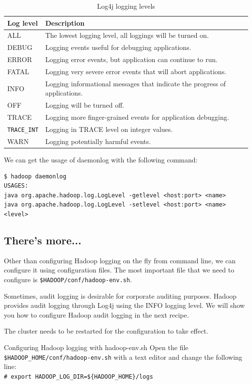 \begin{table}
  \begin{tabular}{ll}
    \toprule 
    \textbf{Log level} & \textbf{Description} \\ \midrule
    ALL & The lowest logging level, all loggings will be turned on. \\
    DEBUG & Logging events useful for debugging applications.\\
    ERROR & Logging error events, but application can continue to run. \\
    FATAL & Logging very severe error events that will abort applications. \\
    INFO & Logging informational messages that indicate the progress of applications. \\
    OFF & Logging will be turned off. \\
    TRACE & Logging more finger-grained events for application debugging. \\
    \verb|TRACE_INT| & Logging in TRACE level on integer values. \\
    WARN & Logging potentially harmful events. \\ \bottomrule
  \end{tabular}
  \caption{Log4j logging levels}\label{tbl:log4j}
\end{table}

We can get the usage of daemonlog with the following command:
\begin{verbatim}
$ hadoop daemonlog
USAGES:
java org.apache.hadoop.log.LogLevel -getlevel <host:port> <name>
java org.apache.hadoop.log.LogLevel -setlevel <host:port> <name> <level>
\end{verbatim}

\subsection*{There's more...}
Other than configuring Hadoop logging on the fly from command line, we can configure it using configuration files. The most important file that we need to configure is \verb|$HADOOP/conf/hadoop-env.sh|.

Sometimes, audit logging is desirable for corporate auditing purposes. Hadoop provides audit logging through Log4j using the INFO logging level. We will show you how to configure Hadoop audit logging in the next recipe.

The cluster needs to be restarted for the configuration to take effect.

Configuring Hadoop logging with hadoop-env.sh
Open the file \verb|$HADOOP_HOME/conf/hadoop-env.sh| with a text editor and change the following line: \\
\verb|# export HADOOP_LOG_DIR=${HADOOP_HOME}/logs|


